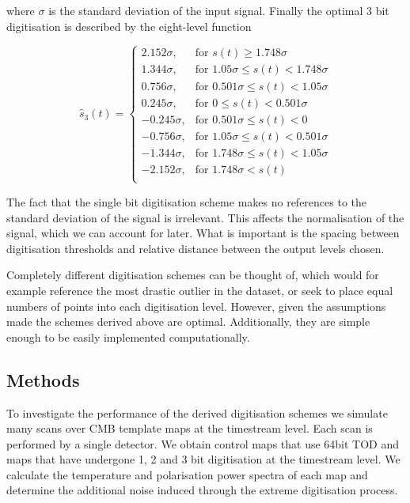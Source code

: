 \documentclass[apj]{emulateapj}
\begin{document}
where $\sigma$ is the standard deviation of the input signal. Finally the optimal 3 bit digitisation is described by the eight-level function

\[ \hat{s}_3(t) = \left\{ \begin{array}{rl}
2.152 \sigma, & \text{for } s(t) \geq 1.748 \sigma\\
1.344 \sigma, & \text{for } 1.05 \sigma \leq s(t) < 1.748 \sigma\\
0.756 \sigma, & \text{for } 0.501 \sigma \leq s(t) < 1.05 \sigma\\
0.245 \sigma, & \text{for } 0 \leq s(t) < 0.501 \sigma\\
-0.245 \sigma, & \text{for } 0.501 \sigma \leq s(t) < 0\\
-0.756 \sigma, & \text{for } 1.05 \sigma \leq s(t) < 0.501 \sigma\\
-1.344 \sigma, & \text{for } 1.748 \sigma \leq s(t) < 1.05 \sigma\\
-2.152 \sigma, & \text{for } 1.748 \sigma < s(t)\\
\end{array} \right. \]

The fact that the single bit digitisation scheme makes no references to the standard deviation of the signal is irrelevant. This affects the normalisation of the signal, which we can account for later. What is important is the spacing between digitisation thresholds and relative distance between the output levels chosen.

Completely different digitisation schemes can be thought of, which would for example reference the most drastic outlier in the dataset, or seek to place equal numbers of points into each digitisation level. However, given the assumptions made the schemes derived above are optimal. Additionally, they are simple enough to be easily implemented computationally.

\subsection{Methods}
\label{subsec:method}

To investigate the performance of the derived digitisation schemes we simulate many scans over CMB template maps at the timestream level. Each scan is performed by a single detector. We obtain control maps that use 64bit TOD and maps that have undergone 1, 2 and 3 bit digitisation at the timestream level. We calculate the temperature and polarisation power spectra of each map and determine the additional noise induced through the extreme digitisation process.
\end{document}
